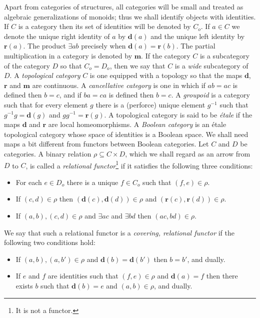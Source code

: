 \documentclass[a4paper]{amsart}
\begin{document}
Apart from categories of structures, all categories will be small and treated as algebraic generalizations of monoids;
thus we shall identify objects with identities.
If $C$ is a category then its set of identities will be denoted by $C_{o}$.
If $a \in C$ we denote the unique right identity of $a$ by $\mathbf{d}(a)$
and the unique left identity  by $\mathbf{r}(a)$.
The product $\exists ab$ precisely when
$\mathbf{d}(a) = \mathbf{r}(b)$. 
The partial multiplication in a category is denoted by $\mathbf{m}$. 
If the category $C$ is a subcategory of the category $D$ so that $C_{o} = D_{o}$,
then we say that $C$ is a {\em wide} subcategory of $D$.
A {\em topological category} $C$ is one equipped with a topology so that the maps $\mathbf{d}$, $\mathbf{r}$ and $\mathbf{m}$
are continuous.
A {\em cancellative category} is one in which if $ab = ac$ is defined then $b = c$,
and if $ba = ca$ is defined then $b = c$.
A {\em groupoid} is a category such that for every element $g$ there is a (perforce) unique element $g^{-1}$
such that $g^{-1}g = \mathbf{d}(g)$ and $gg^{-1} = \mathbf{r}(g)$. 
A topological category is said to be {\em \'etale} if the maps $\mathbf{d}$ and $\mathbf{r}$ are local homeomorphisms.
A {\em Boolean category} is an \'etale topological category whose space of identities is a Boolean space.
We shall need maps a bit different from functors between Boolean categories.
Let $C$ and $D$ be categories.
A binary relation $\rho \subseteq C \times D$, which we shall regard as an arrow from $D$ to $C$, is called a 
{\em relational functor}\footnote{It is not a functor.} if it satisfies the following three conditions:
\begin{itemize}
\item[{\rm (RF1).}] For each $e \in D_{o}$ there is a unique $f \in C_{o}$ such that $(f,e) \in \rho$.
\item[{\rm (RF2).}] If $(c,d) \in \rho$ then $(\mathbf{d}(c), \mathbf{d}(d)) \in \rho$ and $(\mathbf{r}(c), \mathbf{r}(d)) \in \rho$. 
\item[{\rm (RF3).}] If $(a,b), (c,d) \in \rho$ and $\exists ac$ and $\exists  bd$ then $(ac,bd) \in \rho$.
\end{itemize}
We say that such a relational functor is a {\em covering, relational functor} if the following two conditions hold:
\begin{itemize}
\item[{\rm (CRF1).}] If $(a,b), (a,b') \in \rho$ and $\mathbf{d}(b) = \mathbf{d}(b')$ then $b = b'$, and dually.
\item[{\rm (CRF2).}] If $e$ and $f$ are identities such that $(f,e) \in \rho$ and $\mathbf{d}(a) = f$ then there exists $b$ such that
$\mathbf{d}(b) = e$ and $(a,b) \in \rho$, and dually.
\end{itemize}
\end{document}
